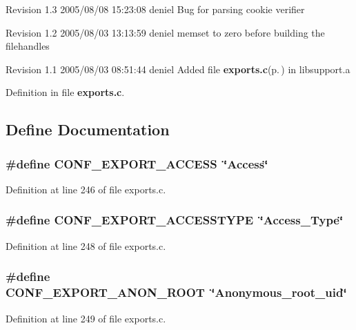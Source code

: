 Revision 1.3 2005/08/08 15:23:08 deniel Bug for parsing cookie verifier

Revision 1.2 2005/08/03 13:13:59 deniel memset to zero before building the filehandles

Revision 1.1 2005/08/03 08:51:44 deniel Added file {\bf exports.c}{\rm (p.\,\pageref{exports_8c})} in libsupport.a

Definition in file {\bf exports.c}.

\subsection{Define Documentation}
\subsubsection{\setlength{\rightskip}{0pt plus 5cm}\#define CONF\_\-EXPORT\_\-ACCESS\ \char`\"{}Access\char`\"{}}\label{exports_8c_a5}




Definition at line 246 of file exports.c.
\subsubsection{\setlength{\rightskip}{0pt plus 5cm}\#define CONF\_\-EXPORT\_\-ACCESSTYPE\ \char`\"{}Access\_\-Type\char`\"{}}\label{exports_8c_a7}




Definition at line 248 of file exports.c.
\subsubsection{\setlength{\rightskip}{0pt plus 5cm}\#define CONF\_\-EXPORT\_\-ANON\_\-ROOT\ \char`\"{}Anonymous\_\-root\_\-uid\char`\"{}}\label{exports_8c_a8}




Definition at line 249 of file exports.c.
